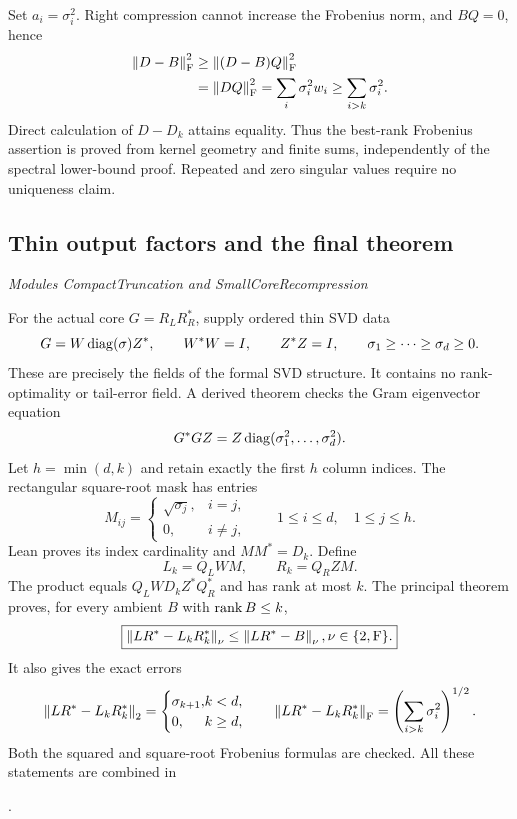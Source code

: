 Set $a_i=\sigma_i^2$. Right compression cannot increase the Frobenius norm, and $BQ=0$, hence
\[
\begin{aligned}
\norm{D-B}_{\mathrm F}^{2}
&\geq\norm{(D-B)Q}_{\mathrm F}^{2}\\
&=\norm{DQ}_{\mathrm F}^{2}
=\sum_i\sigma_i^2w_i
\geq\sum_{i>k}\sigma_i^2.
\end{aligned}
\]
Direct calculation of $D-D_k$ attains equality. Thus the best-rank Frobenius assertion is proved from kernel geometry and finite sums, independently of the spectral lower-bound proof. Repeated and zero singular values require no uniqueness claim.



\subsection{Thin output factors and the final theorem}\label{supp6:subsection:005}\textit{Modules CompactTruncation and SmallCoreRecompression}\par
For the actual core $G=R_LR_R^*$, supply ordered thin SVD data
\[
G=W\operatorname{diag}(\sigma)Z^*,\qquad W^*W=I,
\qquad Z^*Z=I,\qquad \sigma_1\geq\cdots\geq\sigma_d\geq0.
\]
These are precisely the fields of the formal SVD structure. It contains no rank-optimality or tail-error field. A derived theorem checks the Gram eigenvector equation
\[
G^*GZ=Z\operatorname{diag}(\sigma_1^2,\ldots,\sigma_d^2).
\]
Let $h=\min(d,k)$ and retain exactly the first $h$ column indices. The rectangular square-root mask has entries
\[
M_{ij}=\begin{cases}\sqrt{\sigma_j},&i=j,\\0,&i\ne j,\end{cases}
\qquad 1\leq i\leq d,\quad 1\leq j\leq h.
\]
Lean proves its index cardinality and $MM^*=D_k$. Define
\[
\boxed{L_k=Q_LWM,\qquad R_k=Q_RZM.}
\]
The product equals $Q_LWD_kZ^*Q_R^*$ and has rank at most $k$. The principal theorem proves, for every ambient $B$ with $\operatorname{rank} B\leq k$,
\[
\boxed{\norm{LR^*-L_kR_k^*}_\nu\leq\norm{LR^*-B}_\nu,
\quad\nu\in\{2,\mathrm F\}.}
\]
It also gives the exact errors
\[
\norm{LR^*-L_kR_k^*}_2=
\begin{cases}\sigma_{k+1},&k<d,\\0,&k\geq d,\end{cases}
\qquad
\norm{LR^*-L_kR_k^*}_{\mathrm F}
=\left(\sum_{i>k}\sigma_i^2\right)^{1/2}.
\]
Both the squared and square-root Frobenius formulas are checked. All these statements are combined in\par
{}.

